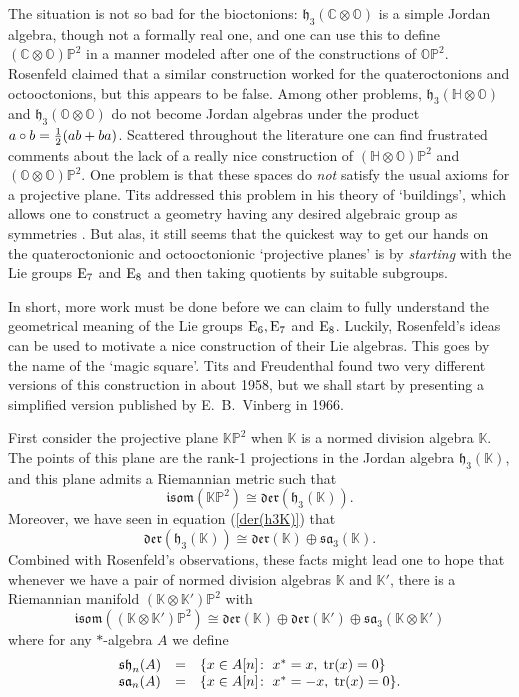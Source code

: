 \documentclass[12pt]{article}
\newcommand\C{{\mathbb C}}
\renewcommand\H{{\mathbb H}}
\newcommand\K{{\mathbb K}}
\renewcommand\O{{\mathbb O}}
\newcommand\KP{{\mathbb {KP}}}
\newcommand\OP{{\mathbb {OP}}}
\renewcommand\P{{\mathbb P}}
\newcommand{\E}{{\rm E}}
\newcommand{\sa}{{\mathfrak {sa}}}
\newcommand{\h}{{\mathfrak {h}}}
\newcommand{\sh}{{\mathfrak {sh}}}
\newcommand{\isom}{{\mathfrak {isom}}}
\newcommand{\Der}{{\mathfrak {der}}}
\newcommand{\tensor}{\otimes}
\newcommand{\iso}{\cong}
\newcommand{\tr}{{\rm tr}}
\begin{document}
The situation is not so bad for the bioctonions: $\h_3(\C \tensor \O)$
is a simple Jordan algebra, though not a formally real one, and one can
use this to define $(\C \tensor \O)\P^2$ in a manner modeled after one
of the constructions of $\OP^2$.  Rosenfeld claimed that a similar
construction worked for the quateroctonions and octooctonions, but this
appears to be false.  Among other problems, $\h_3(\H \tensor \O)$ and
$\h_3(\O \tensor \O)$  do not become Jordan algebras under the product
$a \circ b =  {1\over 2}(ab + ba)$.  Scattered throughout the literature
\cite{Besse,Freudenthal3,Freudenthal5} one can find frustrated comments
about the lack of a really nice construction of $(\H \tensor \O)\P^2$
and $(\O \tensor \O)\P^2$.  One problem is that these spaces do {\it
not} satisfy the usual axioms for a projective plane.   Tits addressed
this problem in his theory of `buildings', which allows one to construct
a geometry having any desired algebraic group as symmetries
\cite{Tits4}.  But alas, it still seems that the quickest way to get our
hands on the quateroctonionic and octooctonionic `projective planes' is
by {\it starting} with the Lie groups $\E_7$ and $\E_8$ and then taking
quotients by suitable subgroups.

In short, more work must be done before we can claim to fully understand
the geometrical meaning of the Lie groups $\E_6, \E_7$ and $\E_8$. 
Luckily, Rosenfeld's ideas can be used to motivate a nice construction
of their Lie algebras.  This goes by the name of the `magic square'.  
Tits \cite{Tits3} and Freudenthal \cite{Freudenthal2} found two very
different versions of this construction in about 1958, but we shall
start by presenting a simplified version published by E.\ B.\ Vinberg
\cite{Vinberg} in 1966.

First consider the projective plane $\KP^2$ when $\K$ is a normed
division algebra $\K$.  The points of this plane are the rank-1
projections in the Jordan algebra $\h_3(\K)$, and this plane admits a
Riemannian metric such that
\[   \isom(\KP^2) \iso \Der(\h_3(\K)). \] 
Moreover, we have seen in equation (\ref{der(h3K)}) that 
\[   \Der(\h_3(\K)) \iso \Der(\K) \oplus \sa_3(\K) . \]
Combined with Rosenfeld's observations, these facts might lead one to 
hope that whenever we have a pair of normed division algebras $\K$ and 
$\K'$, there is a Riemannian manifold $(\K \tensor \K')\P^2$ with
\[   \isom((\K\tensor \K')\P^2) \iso 
\Der(\K) \oplus \Der(\K') \oplus \sa_3(\K \tensor \K')  \]
where for any $\ast$-algebra $A$ we define
\[
\begin{array}{lcl}
    \sh_n(A) & =& \{ x \in A[n] \colon \; x^* = x, \; \tr(x) = 0\}   \\
    \sa_n(A) & =& \{ x \in A[n] \colon \; x^* = -x, \; \tr(x) = 0\}.  
\end{array}
\]
\end{document}
